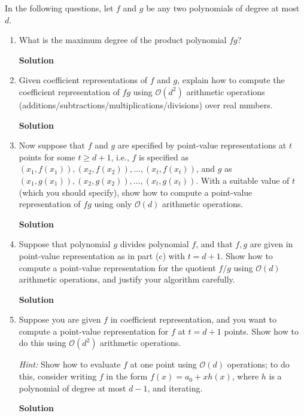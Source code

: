 \documentclass{article}\usepackage{amsmath,amssymb,amsthm,tikz,tkz-graph,color,chngpage,soul,hyperref,csquotes,graphicx,floatrow}\newcommand*{\QEDB}{\hfill\ensuremath{\square}}\newtheorem*{prop}{Proposition}\renewcommand{\theenumi}{\alph{enumi}}\usepackage[shortlabels]{enumitem}\usepackage[nobreak=true]{mdframed}\usetikzlibrary{matrix,calc}\MakeOuterQuote{"}\usepackage[margin=0.75in]{geometry} \newtheorem{theorem}{Theorem}
\begin{document}
\noindent In the following questions, let $f$ and $g$ be any two polynomials of degree at most $d$.
\begin{enumerate}
\item What is the maximum degree of the product polynomial $fg$?
\begin{mdframed}
\textbf{Solution}

\end{mdframed}
\item Given coefficient representations of $f$ and $g$, explain how to compute the coefficient representation of $fg$ using $\mathcal{O}(d^2)$ arithmetic operations (additions/subtractions/multiplications/divisions) over real numbers.
\begin{mdframed}
\textbf{Solution}

\end{mdframed}
\item Now suppose that $f$ and $g$ are specified by point-value representations at $t$ points for some $t\geqslant d+1$, i.e., $f$ is specified as $(x_1,f(x_1)),(x_2,f(x_2)),\ldots,(x_t,f(x_t))$, and $g$ as $(x_1,g(x_1)), (x_2,g(x_2)),\ldots,(x_t,g(x_t))$. With a suitable value of $t$ (which you should specify), show how to compute a point-value representation of $fg$ using only $\mathcal{O}(d)$ arithmetic operations.
\begin{mdframed}
\textbf{Solution}

\end{mdframed}
\item Suppose that polynomial $g$ divides polynomial $f$, and that $f,g$ are given in point-value representation as in part (c) with $t = d + 1$. Show how to compute a point-value representation for the quotient $f/g$ using $\mathcal{O}(d)$ arithmetic operations, and justify your algorithm carefully.
\begin{mdframed}
\textbf{Solution}

\end{mdframed}
\item Suppose you are given $f$ in coefficient representation, and you want to compute a point-value representation for $f$ at $t = d + 1$ points. Show how to do this using $\mathcal{O}(d^2)$ arithmetic operations. 

\textit{Hint:} Show how to evaluate $f$ at one point using $\mathcal{O}(d)$ operations; to do this, consider writing $f$ in the form $f(x) = a_0 + xh(x)$, where $h$ is a polynomial of degree at most $d -1$, and iterating.
\begin{mdframed}
\textbf{Solution}

\end{mdframed}
\end{enumerate}
\clearpage
\end{document}

